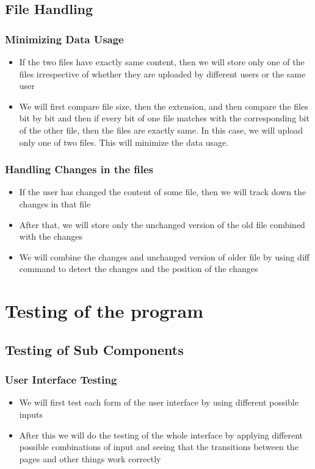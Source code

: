 \documentclass{article}
\begin{document}
		\subsection{File Handling}
			\subsubsection{Minimizing Data Usage}
				\begin{itemize}
					\item If the two files have exactly same content, then we will store only one of the files irrespective of whether they are uploaded by different users or the same user
					\item We will first compare file size, then the extension, and then compare the files bit by bit and then if every bit of one file matches with the corresponding bit of the other file, then the files are exactly same. In this case, we will upload only one of two files. This will minimize the data usage.
				\end{itemize}
			\subsubsection{Handling Changes in the files}
				\begin{itemize}
					\item If the user has changed the content of some file, then we will track down the changes in that file
					\item After that, we will store only the unchanged version of the old file combined with the changes 
					\item We will combine the changes and unchanged version of older file by using diff command to detect the changes and the position of the changes
				\end{itemize}
	\section{Testing of the program}
		\subsection{Testing of Sub Components}
			\subsubsection{User Interface Testing}
				\begin{itemize}
					\item We will first test each form of the user interface by using different possible inputs
					\item After this we will do the testing of the whole interface by applying different possible combinations of input and seeing that the transitions between the pages and other things work correctly
				\end{itemize}
\end{document}
